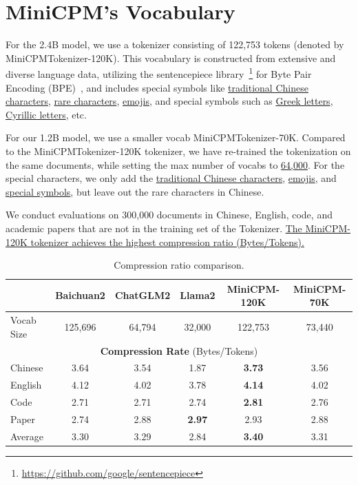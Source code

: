 \section{MiniCPM's Vocabulary}
\label{app:tokenizer}

For the 2.4B model, we use a tokenizer consisting of 122,753 tokens (denoted by MiniCPMTokenizer-120K). This vocabulary is constructed from extensive and diverse language data, utilizing the sentencepiece library~\footnote{\url{https://github.com/google/sentencepiece}} for Byte Pair Encoding (BPE)~\citep{sennrich-etal-2016-neural}, and includes special symbols like \uline{traditional Chinese characters}, \uline{rare characters}, \uline{emojis}, and special symbols such as \uline{Greek letters}, \uline{Cyrillic letters}, etc.

For our 1.2B model, we use a smaller vocab MiniCPMTokenizer-70K. Compared to the MiniCPMTokenizer-120K tokenizer, we have re-trained the tokenization on the same documents, while setting the max number of vocabs to \uline{64,000}. For the special characters, we only add the \uline{traditional Chinese characters}, \uline{emojis}, and \uline{special symbols}, but leave out the rare characters in Chinese. 

We conduct evaluations on 300,000 documents in Chinese, English, code, and academic papers that are not in the training set of the Tokenizer. \uline{The MiniCPM-120K tokenizer achieves the highest compression ratio (Bytes/Tokens).}

\begin{table}[htbp]
\centering
\begin{tabular}{lccccc}
\toprule
  & {\textbf{Baichuan2}}  & {\textbf{ChatGLM2}} & {\textbf{Llama2}} & {\textbf{MiniCPM-120K}}  & {\textbf{MiniCPM-70K}}\\
\midrule
Vocab Size & 125,696 & 64,794 & 32,000 & 122,753 & 73,440\\
\midrule
\multicolumn{6}{c}{\textbf{Compression Rate} (Bytes/Tokens) }\\
\midrule
Chinese & 3.64   & 3.54  & 1.87  & \textbf{3.73} &  3.56 \\
English & 4.12   & 4.02  & 3.78  & \textbf{4.14} & 4.02 \\
Code    & 2.71   & 2.71  & 2.74  & \textbf{2.81} & 2.76 \\
Paper   & 2.74   & 2.88  & \textbf{2.97}  & 2.93 & 2.88\\
\midrule
Average & 3.30   & 3.29  & 2.84  & \textbf{3.40}  & 3.31 \\
\bottomrule
\end{tabular}
\caption{Compression ratio comparison.}
\label{tab:compression_ratio}
\end{table}